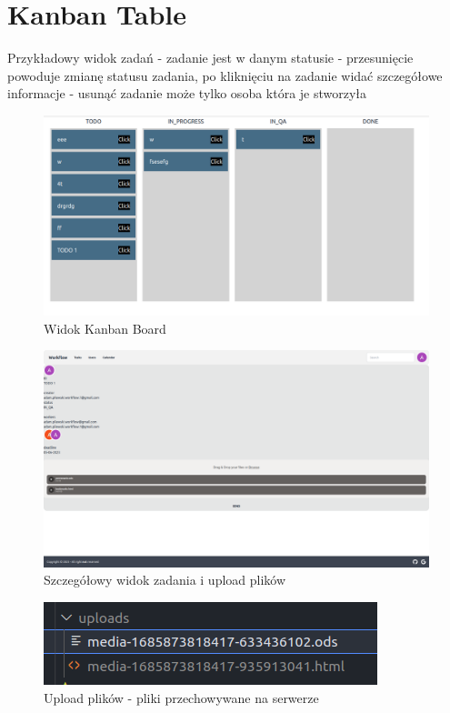 \documentclass[a4paper, 12pt]{article}
\begin{document}
\section{Kanban Table}
Przykładowy widok zadań - zadanie jest w danym statusie - przesunięcie powoduje zmianę statusu zadania, po kliknięciu na zadanie widać szczegółowe informacje - usunąć zadanie może tylko osoba która je stworzyła
\begin{figure}[H]
	\centering
    \includegraphics*[scale=0.4]{img/kanban.png}
	\caption{Widok Kanban Board}
\end{figure}
\begin{figure}[H]
	\centering
    \includegraphics*[scale=0.2]{img/task-send-files.png}
	\caption{Szczegółowy widok zadania i upload plików}
\end{figure}
\begin{figure}[H]
	\centering
    \includegraphics*[scale=0.7]{img/task-send-files-2.png}
	\caption{Upload plików - pliki przechowywane na serwerze}
\end{figure}
\end{document}
